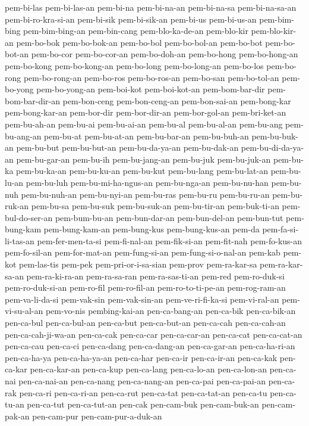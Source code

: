 {pem-bi-las pem-bi-las-an pem-bi-na pem-bi-na-an pem-bi-na-sa
pem-bi-na-sa-an pem-bi-ro-kra-si-an pem-bi-sik pem-bi-sik-an pem-bi-us
pem-bi-us-an pem-bim-bing pem-bim-bing-an pem-bin-cang pem-blo-ka-de-an
pem-blo-kir pem-blo-kir-an pem-bo-bok pem-bo-bok-an pem-bo-bol
pem-bo-bol-an pem-bo-bot pem-bo-bot-an pem-bo-cor pem-bo-cor-an
pem-bo-doh-an pem-bo-hong pem-bo-hong-an pem-bo-kong pem-bo-kong-an
pem-bo-long pem-bo-long-an pem-bo-los pem-bo-rong pem-bo-rong-an
pem-bo-ros pem-bo-ros-an pem-bo-san pem-bo-tol-an pem-bo-yong
pem-bo-yong-an pem-boi-kot pem-boi-kot-an pem-bom-bar-dir
pem-bom-bar-dir-an pem-bon-ceng pem-bon-ceng-an pem-bon-sai-an
pem-bong-kar pem-bong-kar-an pem-bor-dir pem-bor-dir-an pem-bor-gol-an
pem-bri-ket-an pem-bu-ah-an pem-bu-ai pem-bu-ai-an pem-bu-al pem-bu-al-an
pem-bu-ang pem-bu-ang-an pem-bu-at pem-bu-at-an pem-bu-bar-an
pem-bu-buh-an pem-bu-buk-an pem-bu-but pem-bu-but-an pem-bu-da-ya-an
pem-bu-dak-an pem-bu-di-da-ya-an pem-bu-gar-an pem-bu-ih pem-bu-jang-an
pem-bu-juk pem-bu-juk-an pem-bu-ka pem-bu-ka-an pem-bu-ku-an pem-bu-kut
pem-bu-lang pem-bu-lat-an pem-bu-lu-an pem-bu-luh pem-bu-mi-ha-ngus-an
pem-bu-nga-an pem-bu-nu-han pem-bu-nuh pem-bu-nuh-an pem-bu-nyi-an
pem-bu-ras pem-bu-ru pem-bu-ru-an pem-bu-ruk-an pem-bu-sa pem-bu-suk
pem-bu-suk-an pem-bu-tir-an pem-buk-ti-an pem-bul-do-ser-an pem-bum-bu-an
pem-bun-dar-an pem-bun-del-an pem-bun-tut pem-bung-kam pem-bung-kam-an
pem-bung-kus pem-bung-kus-an pem-da pem-fa-si-li-tas-an pem-fer-men-ta-si
pem-fi-nal-an pem-fik-si-an pem-fit-nah pem-fo-kus-an pem-fo-sil-an
pem-for-mat-an pem-fung-si-an pem-fung-si-o-nal-an pem-kab pem-kot
pem-las-tis pem-pek pem-pri-or-i-sa-sian pem-prov pem-ra-kar-sa
pem-ra-kar-sa-an pem-ra-ki-ra-an pem-ra-sa-ran pem-ra-sas-ti-an pem-red
pem-ro-duk-si pem-ro-duk-si-an pem-ro-fil pem-ro-fil-an pem-ro-to-ti-pe-an
pem-rog-ram-an pem-va-li-da-si pem-vak-sin pem-vak-sin-an
pem-ve-ri-fi-ka-si pem-vi-ral-an pem-vi-su-al-an pem-vo-nis pembing-kai-an
pen-ca-bang-an pen-ca-bik pen-ca-bik-an pen-ca-bul pen-ca-bul-an
pen-ca-but pen-ca-but-an pen-ca-cah pen-ca-cah-an pen-ca-cah-ji-wa-an
pen-ca-cak pen-ca-car pen-ca-car-an pen-ca-cat pen-ca-cat-an pen-ca-cau
pen-ca-ci pen-ca-dang pen-ca-dang-an pen-ca-gar-an pen-ca-ha-ri-an
pen-ca-ha-ya pen-ca-ha-ya-an pen-ca-har pen-ca-ir pen-ca-ir-an pen-ca-kak
pen-ca-kar pen-ca-kar-an pen-ca-kup pen-ca-lang pen-ca-lo-an pen-ca-lon-an
pen-ca-nai pen-ca-nai-an pen-ca-nang pen-ca-nang-an pen-ca-pai
pen-ca-pai-an pen-ca-rak pen-ca-ri pen-ca-ri-an pen-ca-rut pen-ca-tat
pen-ca-tat-an pen-ca-tu pen-ca-tu-an pen-ca-tut pen-ca-tut-an pen-cak
pen-cam-buk pen-cam-buk-an pen-cam-pak-an pen-cam-pur pen-cam-pur-a-duk-an
}
